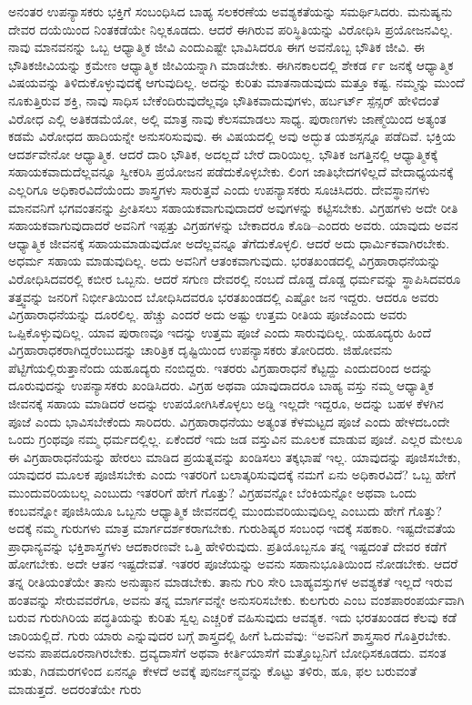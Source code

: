 ಅನಂತರ ಉಪನ್ಯಾಸಕರು ಭಕ್ತಿಗೆ ಸಂಬಂಧಿಸಿದ ಬಾಹ್ಯ ಸಲಕರಣೆಯ ಅವಶ್ಯಕತೆಯನ್ನು ಸಮರ್ಥಿಸಿದರು. ಮನುಷ್ಯನು ದೇವರ ದಯೆಯಿಂದ ನಿಂತಕಡೆಯೇ ನಿಲ್ಲಕೂಡದು. ಆದರೆ ಈಗಿರುವ ಪರಿಸ್ಥಿತಿಯನ್ನು ವಿರೋಧಿಸಿ ಪ್ರಯೋಜನವಿಲ್ಲ. ನಾವು ಮಾನವನನ್ನು ಒಬ್ಬ ಆಧ್ಯಾತ್ಮಿಕ ಜೀವಿ ಎಂದು\break ಎಷ್ಟೇ ಭಾವಿಸಿದರೂ ಈಗ ಅವನೊಬ್ಬ ಭೌತಿಕ ಜೀವಿ. ಈ ಭೌತಿಕ\break ಜೀವಿಯನ್ನು ಕ್ರಮೇಣ ಆಧ್ಯಾತ್ಮಿಕ ಜೀವಿಯನ್ನಾಗಿ ಮಾಡಬೇಕು. ಈಗಿನ\break ಕಾಲದಲ್ಲಿ ಶೇಕಡ ೯೯ ಜನಕ್ಕೆ ಆಧ್ಯಾತ್ಮಿಕ ವಿಷಯವನ್ನು ತಿಳಿದುಕೊಳ್ಳುವುದಕ್ಕೆ ಆಗುವುದಿಲ್ಲ. ಅದನ್ನು ಕುರಿತು ಮಾತನಾಡುವುದು ಮತ್ತೂ ಕಷ್ಟ. ನಮ್ಮನ್ನು ಮುಂದೆ ನೂಕುತ್ತಿರುವ ಶಕ್ತಿ, ನಾವು ಸಾಧಿಸ ಬೇಕೆಂದಿರುವುದೆಲ್ಲವೂ ಭೌತಿಕವಾದುವುಗಳು, ಹರ್ಬರ್ಟ್​ ಸ್ಪೆನ್ಸರ್​ ಹೇಳಿದಂತೆ ವಿರೋಧ ಎಲ್ಲಿ ಅತಿ\break ಕಡಮೆಯೋ, ಅಲ್ಲಿ ಮಾತ್ರ ನಾವು ಕೆಲಸಮಾಡಲು ಸಾಧ್ಯ. ಪುರಾಣಗಳು ಜಾಣ್ಮೆಯಿಂದ ಅತ್ಯಂತ ಕಡಮೆ ವಿರೋಧದ ಹಾದಿಯನ್ನೇ ಅನುಸರಿಸುವುವು. ಈ ವಿಷಯದಲ್ಲಿ ಅವು ಅದ್ಭುತ ಯಶಸ್ಸನ್ನೂ ಪಡೆದಿವೆ. ಭಕ್ತಿಯ ಆದರ್ಶವೇನೋ ಆಧ್ಯಾತ್ಮಿಕ. ಆದರೆ ದಾರಿ ಭೌತಿಕ, ಅದಲ್ಲದೆ ಬೇರೆ ದಾರಿಯಿಲ್ಲ. ಭೌತಿಕ ಜಗತ್ತಿನಲ್ಲಿ ಆಧ್ಯಾತ್ಮಿಕಕ್ಕೆ ಸಹಾಯಕವಾದುದೆಲ್ಲವನ್ನೂ ಸ್ವೀಕರಿಸಿ ಪ್ರಯೋಜನ ಪಡೆದುಕೊಳ್ಳಬೇಕು. ಲಿಂಗ ಜಾತಿಭೇದಗಳಿಲ್ಲದೆ ವೇದಾ\-ಧ್ಯಯನಕ್ಕೆ ಎಲ್ಲರಿಗೂ ಅಧಿಕಾರವಿದೆಯೆಂದು ಶಾಸ್ತ್ರಗಳು ಸಾರುತ್ತವೆ ಎಂದು ಉಪನ್ಯಾಸಕರು ಸೂಚಿಸಿದರು. ದೇವಸ್ಥಾನಗಳು ಮಾನವನಿಗೆ ಭಗವಂತನನ್ನು ಪ್ರೀತಿಸಲು ಸಹಾಯಕವಾಗುವುದಾದರೆ ಅವುಗಳನ್ನು ಕಟ್ಟಿಸಬೇಕು. ವಿಗ್ರಹಗಳು ಅದೇ ರೀತಿ ಸಹಾಯಕವಾಗುವುದಾದರೆ ಅವನಿಗೆ ಇಪ್ಪತ್ತು ವಿಗ್ರಹಗಳನ್ನು ಬೇಕಾದರೂ ಕೊಡಿ–ಎಂದರು ಅವರು. ಯಾವುದು ಅವನ ಆಧ್ಯಾತ್ಮಿಕ ಜೀವನಕ್ಕೆ ಸಹಾಯಮಾಡುವುದೋ ಅದೆಲ್ಲವನ್ನೂ ತೆಗೆದುಕೊಳ್ಳಲಿ. ಆದರೆ ಅದು ಧಾರ್ಮಿಕ\-ವಾಗಿರಬೇಕು. ಅಧರ್ಮ ಸಹಾಯ ಮಾಡುವುದಿಲ್ಲ. ಅದು ಅವನಿಗೆ ಆತಂಕವಾಗುವುದು. ಭರತಖಂಡದಲ್ಲಿ ವಿಗ್ರಹಾರಾಧನೆಯನ್ನು ವಿರೋಧಿಸಿದವರಲ್ಲಿ ಕಬೀರ ಒಬ್ಬನು. ಆದರೆ ಸಗುಣ ದೇವರಲ್ಲಿ ನಂಬದೆ ದೊಡ್ಡ ದೊಡ್ಡ ಧರ್ಮವನ್ನು ಸ್ಥಾಪಿಸಿದವರೂ ತತ್ತ್ವವನ್ನು ಜನರಿಗೆ ನಿರ್ಭೀತಿಯಿಂದ ಬೋಧಿಸಿದವರೂ ಭರತಖಂಡದಲ್ಲಿ ಎಷ್ಟೋ ಜನ ಇದ್ದರು. ಆದರೂ ಅವರು ವಿಗ್ರಹಾರಾಧನೆಯನ್ನು ದೂರಲಿಲ್ಲ. ಹೆಚ್ಚು ಎಂದರೆ ಅದು ಅಷ್ಟು ಉತ್ತಮ ರೀತಿಯ ಪೂಜೆ\break ಎಂದು ಅವರು ಒಪ್ಪಿಕೊಳ್ಳುವುದಿಲ್ಲ. ಯಾವ ಪುರಾಣವೂ ಇದನ್ನು ಉತ್ತಮ ಪೂಜೆ ಎಂದು ಸಾರುವುದಿಲ್ಲ. ಯಹೂದ್ಯರು ಹಿಂದೆ ವಿಗ್ರಹಾರಾಧಕರಾಗಿದ್ದ\-ರೆಂಬುದನ್ನು ಚಾರಿತ್ರಿಕ ದೃಷ್ಟಿಯಿಂದ ಉಪನ್ಯಾಸಕರು ತೋರಿದರು. ಜಿಹೋವನು ಪೆಟ್ಟಿಗೆಯಲ್ಲಿರುತ್ತಾನೆಂದು ಯಹೂದ್ಯರು ನಂಬಿದ್ದರು. ಇತರರು ವಿಗ್ರಹಾ\-ರಾಧನೆ ಕೆಟ್ಟದ್ದು ಎಂದುದರಿಂದ ಅದನ್ನು ದೂರುವುದನ್ನು ಉಪನ್ಯಾಸಕರು ಖಂಡಿಸಿದರು. ವಿಗ್ರಹ ಅಥವಾ ಯಾವುದಾದರೂ ಬಾಹ್ಯ ವಸ್ತು ನಮ್ಮ ಆಧ್ಯಾತ್ಮಿಕ ಜೀವನಕ್ಕೆ ಸಹಾಯ ಮಾಡಿದರೆ ಅದನ್ನು ಉಪಯೋಗಿಸಿಕೊಳ್ಳಲು ಅಡ್ಡಿ ಇಲ್ಲದೇ ಇದ್ದರೂ, ಅದನ್ನು ಬಹಳ ಕೆಳಗಿನ ಪೂಜೆ ಎಂದು ಭಾವಿಸಬೇಕೆಂದು ಸಾರಿದರು. ವಿಗ್ರಹಾರಾಧನೆಯು ಅತ್ಯಂತ ಕೆಳಮಟ್ಟದ ಪೂಜೆ ಎಂದು ಹೇಳದ\break ಒಂದೇ ಒಂದು ಗ್ರಂಥವೂ ನಮ್ಮ ಧರ್ಮದಲ್ಲಿಲ್ಲ. ಏಕೆಂದರೆ ಇದು ಜಡ ವಸ್ತುವಿನ ಮೂಲಕ ಮಾಡುವ ಪೂಜೆ. ಎಲ್ಲರ ಮೇಲೂ ಈ ವಿಗ್ರಹಾ\-ರಾಧನೆಯನ್ನು ಹೇರಲು ಮಾಡಿದ ಪ್ರಯತ್ನವನ್ನು ಖಂಡಿಸಲು ತಕ್ಕಭಾಷೆ ಇಲ್ಲ. ಯಾವುದನ್ನು ಪೂಜಿಸಬೇಕು, ಯಾವುದರ ಮೂಲಕ ಪೂಜಿಸಬೇಕು ಎಂದು ಇತರರಿಗೆ ಬಲಾತ್ಕರಿಸುವುದಕ್ಕೆ ನಮಗೆ ಏನು ಅಧಿಕಾರವಿದೆ? ಒಬ್ಬ ಹೇಗೆ ಮುಂದುವರಿಯಬಲ್ಲ ಎಂಬುದು ಇತರರಿಗೆ ಹೇಗೆ ಗೊತ್ತು? ವಿಗ್ರಹವನ್ನೋ ಬೆಂಕಿಯನ್ನೋ ಅಥವಾ ಒಂದು ಕಂಬವನ್ನೋ ಪೂಜಿಸಿಯೂ ಒಬ್ಬನು ಆಧ್ಯಾತ್ಮಿಕ ಜೀವನದಲ್ಲಿ ಮುಂದುವರಿಯುವುದಿಲ್ಲ ಎಂಬುದು ಹೇಗೆ ಗೊತ್ತು? ಅದಕ್ಕೆ ನಮ್ಮ ಗುರುಗಳು ಮಾತ್ರ ಮಾರ್ಗದರ್ಶಕರಾಗಬೇಕು. ಗುರುಶಿಷ್ಯರ ಸಂಬಂಧ ಇದಕ್ಕೆ ಸಹಕಾರಿ. ಇಷ್ಟದೇವತೆಯ ಪ್ರಾಧಾನ್ಯವನ್ನು ಭಕ್ತಿಶಾಸ್ತ್ರಗಳು ಆದಕಾರಣವೇ ಒತ್ತಿ ಹೇಳಿರುವುದು. ಪ್ರತಿಯೊಬ್ಬನೂ ತನ್ನ ಇಷ್ಟದಂತೆ ದೇವರ ಕಡೆಗೆ ಹೋಗಬೇಕು. ಅದೇ ಆತನ ಇಷ್ಟದೇವತೆ. ಇತರರ ಪೂಜೆಯನ್ನು ಅವನು ಸಹಾನುಭೂತಿಯಿಂದ ನೋಡಬೇಕು. ಆದರೆ ತನ್ನ ರೀತಿಯಂತೆಯೇ ತಾನು ಅನುಷ್ಠಾನ ಮಾಡಬೇಕು. ತಾನು ಗುರಿ ಸೇರಿ ಬಾಹ್ಯವಸ್ತುಗಳ ಅವಶ್ಯಕತೆ ಇಲ್ಲದೆ ಇರುವ ಹಂತವನ್ನು ಸೇರುವವರೆಗೂ, ಅವನು ತನ್ನ ಮಾರ್ಗವನ್ನೇ ಅನುಸರಿಸಬೇಕು. ಕುಲಗುರು ಎಂಬ ವಂಶಪಾರಂಪರ್ಯವಾಗಿ ಬರುವ ಗುರುಗಿರಿಯ ಪದ್ಧತಿಯನ್ನು ಕುರಿತು ಸ್ವಲ್ಪ ಎಚ್ಚರಿಕೆ ವಹಿಸುವುದು ಆವಶ್ಯಕ. ಇದು ಭರತಖಂಡದ ಕೆಲವು ಕಡೆ ಜಾರಿಯಲ್ಲಿದೆ. ಗುರು ಯಾರು ಎನ್ನುವುದರ ಬಗ್ಗೆ ಶಾಸ್ತ್ರದಲ್ಲಿ ಹೀಗೆ ಓದುವೆವು: “ಅವನಿಗೆ ಶಾಸ್ತ್ರಸಾರ ಗೊತ್ತಿರಬೇಕು. ಅವನು ಪಾಪದೂರನಾಗಿರಬೇಕು. ದ್ರವ್ಯದಾಸೆಗೆ ಅಥವಾ ಕೀರ್ತಿಯಾಸೆಗೆ ಮತ್ತೊಬ್ಬನಿಗೆ ಬೋಧಿಸಕೂಡದು. ವಸಂತ ಋತು, ಗಿಡಮರಗಳಿಂದ ಏನನ್ನೂ ಕೇಳದೆ ಅವಕ್ಕೆ ಪುನರ್ಜನ್ಮವನ್ನು ಕೊಟ್ಟು ತಳಿರು, ಹೂ, ಫಲ ಬರುವಂತೆ ಮಾಡುತ್ತದೆ. ಅದರಂತೆಯೇ ಗುರು 